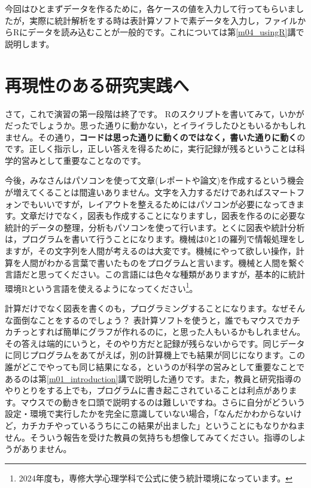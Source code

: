 \documentclass{ltjsbook}
\begin{document}
今回はひとまずデータを作るために，各ケースの値を入力して行ってもらいましたが，実際に統計解析をする時は表計算ソフトで素データを入力し，ファイルからRにデータを読み込むことが一般的です。これについては第\ref{m04_usingR}講で説明します。


\section{再現性のある研究実践へ}
\label{reproducibility}

さて，これで演習の第一段階は終了です。
Rのスクリプトを書いてみて，いかがだったでしょうか。思った通りに動かない，とイライラしたひともいるかもしれません。その通り，\textbf{コードは思った通りに動くのではなく，書いた通りに動く}のです。正しく指示し，正しい答えを得るために，実行記録が残るということは科学的営みとして重要なことなのです。

今後，みなさんはパソコンを使って文章(レポートや論文)を作成するという機会が増えてくることは間違いありません。文字を入力するだけであればスマートフォンでもいいですが，レイアウトを整えるためにはパソコンが必要になってきます。文章だけでなく，図表も作成することになりますし，図表を作るのに必要な統計的データの整理，分析もパソコンを使って行います。とくに図表や統計分析は，プログラムを書いて行うことになります。機械は0と1の羅列で情報処理をしますが，その文字列を人間が考えるのは大変です。機械にやって欲しい操作，計算を人間がわかる言葉で書いたものをプログラムと言います。機械と人間を繋ぐ言語だと思ってください。この言語には色々な種類がありますが，基本的に統計環境Rという言語を使えるようになってください\footnote{2024年度も，専修大学心理学科で公式に使う統計環境になっています。}。

計算だけでなく図表を書くのも，プログラミングすることになります。なぜそんな面倒なことをするのでしょう？ 表計算ソフトを使うと，誰でもマウスでカチカチっとすれば簡単にグラフが作れるのに，と思った人もいるかもしれません。その答えは端的にいうと，そのやり方だと記録が残らないからです。同じデータに同じプログラムをあてがえば，別の計算機上でも結果が同じになります。この誰がどこでやっても同じ結果になる，というのが科学の営みとして重要なことであるのは第\ref{m01_introduction}講で説明した通りです。また，教員と研究指導のやりとりをする上でも，プログラムに書き起こされていることは利点があります。マウスでの動きを口頭で説明するのは難しいですね。さらに自分がどういう設定・環境で実行したかを完全に意識していない場合，「なんだかわからないけど，カチカチやっているうちにこの結果が出ました」ということにもなりかねません。そういう報告を受けた教員の気持ちも想像してみてください。指導のしようがありません。
\end{document}
